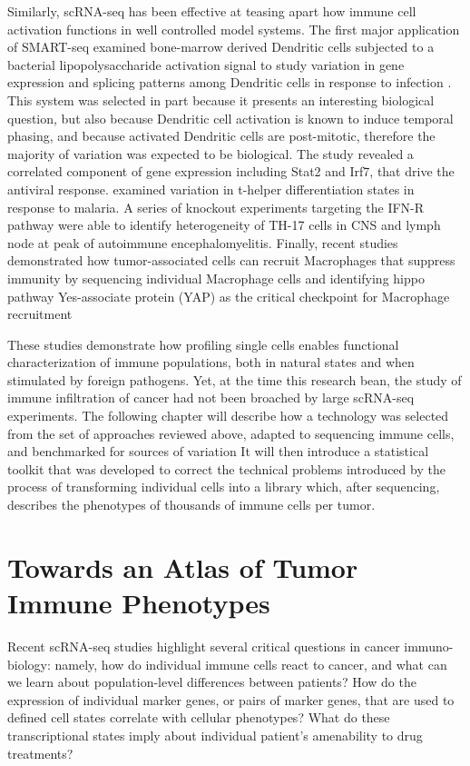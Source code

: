 Similarly, scRNA-seq has been effective at teasing apart how immune cell activation functions in well controlled model systems. 
The first major application of SMART-seq examined bone-marrow derived Dendritic cells subjected to a bacterial lipopolysaccharide activation signal to study variation in gene expression and splicing patterns among Dendritic cells in response to infection \citep{Shalek2013}.
This system was selected in part because it presents an interesting biological question, but also because Dendritic cell activation is known to induce temporal phasing, and because activated Dendritic cells are post-mitotic, therefore the majority of variation was expected to be biological. 
The study revealed a correlated component of gene expression including Stat2 and Irf7, that drive the antiviral response.
\cite{Loennberg2017} examined variation in t-helper differentiation states in response to malaria. 
A series of knockout experiments targeting the IFN-R pathway \citep{Gaublomme2015} were able to identify heterogeneity of TH-17 cells in CNS and lymph node at peak of autoimmune encephalomyelitis. 
Finally, recent studies demonstrated how tumor-associated cells can recruit Macrophages that suppress immunity by sequencing individual Macrophage cells and identifying hippo pathway Yes-associate protein (YAP) as the critical checkpoint for Macrophage recruitment \citep{Guo2017}

These studies demonstrate how profiling single cells enables functional characterization of immune populations, both in natural states and when stimulated by foreign pathogens. 
Yet, at the time this research bean, the study of immune infiltration of cancer had not been broached by large scRNA-seq experiments. 
The following chapter will describe how a technology was selected from the set of approaches reviewed above, adapted to sequencing immune cells, and benchmarked for sources of variation
It will then introduce a statistical toolkit that was developed to correct the technical problems introduced by the process of transforming individual cells into a library which, after sequencing, describes the phenotypes of thousands of immune cells per tumor. 

\section{Towards an Atlas of Tumor Immune Phenotypes}

Recent scRNA-seq studies highlight several critical questions in cancer immuno-biology: namely, how do individual immune cells react to cancer, and what can we learn about population-level differences between patients? 
How do the expression of individual marker genes, or pairs of marker genes, that are used to defined cell states correlate with cellular phenotypes? 
What do these transcriptional states imply about individual patient's amenability to drug treatments?  

